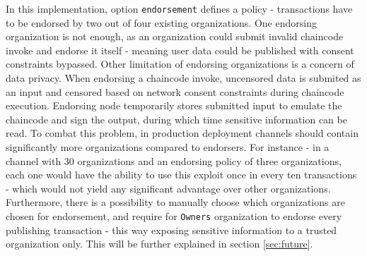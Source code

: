 \documentclass[12pt]{article}
\begin{document}
    In this implementation, option \lstinline{endorsement} defines a policy - transactions have to be endorsed by two out of four existing organizations. One endorsing organization is not enough, as an organization could submit invalid chaincode invoke and endorse it itself - meaning user data could be published with consent constraints bypassed. Other limitation of endorsing organizations is a concern of data privacy. When endorsing a chaincode invoke, uncensored data is submited as an input and censored based on network consent constraints during chaincode execution. Endorsing node temporarily stores submitted input to emulate the chaincode and sign the output, during which time sensitive information can be read. To combat this problem, in production deployment channels should contain significantly more organizations compared to endorsers. For instance - in a channel with 30 organizations and an endorsing policy of three organizations, each one would have the ability to use this exploit once in every ten transactions - which would not yield any significant advantage over other organizations. Furthermore, there is a possibility to manually choose which organizations are chosen for endorsement, and require for \lstinline{Owners} organization to endorse every publishing transaction - this way exposing sensitive information to a trusted organization only. This will be further explained in section \ref{sec:future}.
\end{document}
